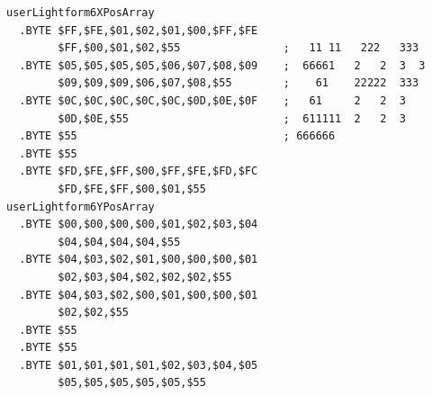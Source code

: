 \begin{minipage}[b]{0.68\linewidth}
\vspace{1cm}
\begin{lrbox}{\mybox}%
\hspace{1cm}
\begin{lstlisting}[basicstyle=\ttfamily\tiny,escapechar=\%]
userLightform6XPosArray
  .BYTE $FF,$FE,$01,$02,$01,$00,$FF,$FE
        $FF,$00,$01,$02,$55                ;   11 11   222   333 
  .BYTE $05,$05,$05,$05,$06,$07,$08,$09    ;  66661   2   2  3  3
        $09,$09,$09,$06,$07,$08,$55        ;    61    22222  333 
  .BYTE $0C,$0C,$0C,$0C,$0C,$0D,$0E,$0F    ;   61     2   2  3   
        $0D,$0E,$55                        ;  611111  2   2  3    
  .BYTE $55                                ; 666666              
  .BYTE $55                                                         
  .BYTE $FD,$FE,$FF,$00,$FF,$FE,$FD,$FC
        $FD,$FE,$FF,$00,$01,$55     
userLightform6YPosArray
  .BYTE $00,$00,$00,$00,$01,$02,$03,$04
        $04,$04,$04,$04,$55
  .BYTE $04,$03,$02,$01,$00,$00,$00,$01
        $02,$03,$04,$02,$02,$02,$55
  .BYTE $04,$03,$02,$00,$01,$00,$00,$01
        $02,$02,$55
  .BYTE $55
  .BYTE $55
  .BYTE $01,$01,$01,$01,$02,$03,$04,$05
        $05,$05,$05,$05,$05,$55
\end{lstlisting}
\end{lrbox}%
\scalebox{0.8}{\usebox{\mybox}}

\end{minipage}
%
%
